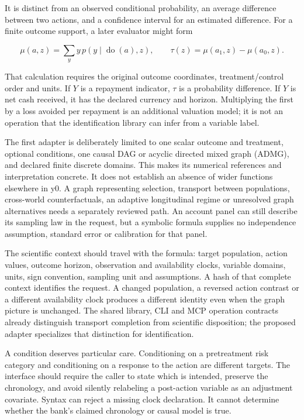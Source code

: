 It is distinct from an observed conditional probability, an average
difference between two actions, and a confidence interval for an
estimated difference. For a finite outcome support, a later evaluator
might form

\[
 \mu(a,z)=\sum_y y\,p(y\mid\operatorname{do}(a),z),
 \qquad \tau(z)=\mu(a_1,z)-\mu(a_0,z).
\]

That calculation requires the original outcome coordinates,
treatment/control order and units. If \(Y\) is a repayment indicator,
\(\tau\) is a probability difference. If \(Y\) is net cash received, it
has the declared currency and horizon. Multiplying the first by a loss
avoided per repayment is an additional valuation model; it is not an
operation that the identification library can infer from a variable
label.

The first adapter is deliberately limited to one scalar outcome and
treatment, optional conditions, one causal DAG or acyclic directed mixed
graph (ADMG), and declared finite discrete domains. This makes its
numerical references and interpretation concrete. It does not establish
an absence of wider functions elsewhere in y0. A graph representing
selection, transport between populations, cross-world counterfactuals,
an adaptive longitudinal regime or unresolved graph alternatives needs a
separately reviewed path. An account panel can still describe its
sampling law in the request, but a symbolic formula supplies no
independence assumption, standard error or calibration for that panel.

The scientific context should travel with the formula: target
population, action values, outcome horizon, observation and availability
clocks, variable domains, units, sign convention, sampling unit and
assumptions. A hash of that complete context identifies the request. A
changed population, a reversed action contrast or a different
availability clock produces a different identity even when the graph
picture is unchanged. The shared library, CLI and MCP operation
contracts already distinguish transport completion from scientific
disposition; the proposed adapter specializes that distinction for
identification. \citep{exec13_y0_contract}

A condition deserves particular care. Conditioning on a pretreatment
risk category and conditioning on a response to the action are different
targets. The interface should require the caller to state which is
intended, preserve the chronology, and avoid silently relabeling a
post-action variable as an adjustment covariate. Syntax can reject a
missing clock declaration. It cannot determine whether the bank's
claimed chronology or causal model is true.

